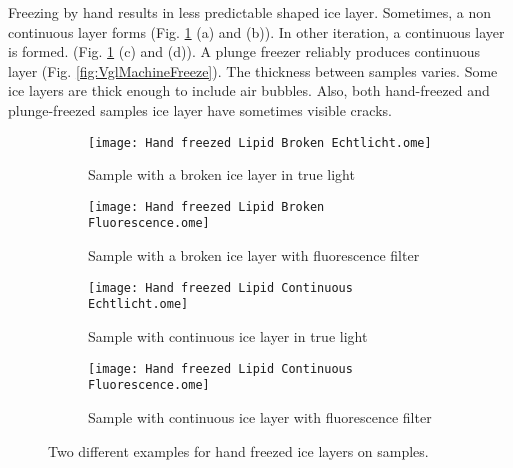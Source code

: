Freezing by hand results in less predictable shaped ice layer. Sometimes, a non continuous layer forms (Fig. \ref{fig:VglHandFreeze} (a) and (b)). In other iteration, a continuous layer is formed. (Fig. \ref{fig:VglHandFreeze} (c) and (d)). A plunge freezer reliably produces continuous layer (Fig. \ref{fig:VglMachineFreeze}). The thickness between samples varies. Some ice layers are thick enough to include air bubbles. Also, both hand-freezed and plunge-freezed samples ice layer have sometimes visible cracks.

\begin{figure}[hbt!]
	\centering
	\begin{subfigure}[]{0.45\textwidth}
		\centering
		\texttt{[image: Hand freezed Lipid Broken Echtlicht.ome]}
		\caption{Sample with a broken ice layer in true light \newline}
	\end{subfigure}
	\begin{subfigure}[]{0.45\textwidth}
		\centering
		\texttt{[image: Hand freezed Lipid Broken Fluorescence.ome]}
		\caption{Sample with a broken ice layer with fluorescence filter}
	\end{subfigure}
	\begin{subfigure}[]{0.45\textwidth}
		\centering
		\texttt{[image: Hand freezed Lipid Continuous Echtlicht.ome]}
		\caption{Sample with continuous ice layer in true light \newline}
	\end{subfigure}
	\begin{subfigure}[]{0.45\textwidth}
		\centering
		\texttt{[image: Hand freezed Lipid Continuous Fluorescence.ome]}
		\caption{Sample with continuous ice layer with fluorescence filter}
	\end{subfigure}
	\caption{Two different examples for hand freezed ice layers on samples. }
	\label{fig:VglHandFreeze}
\end{figure}

